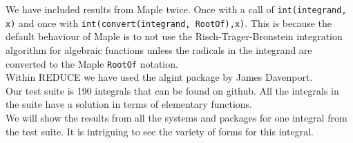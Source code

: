 \documentclass[12pt]{article}
\numberwithin{equation}{section}
\theoremstyle{definition}
\begin{document}
We have included results from Maple twice. Once with a call of \texttt{int(integrand, x)} 
and once with \texttt{int(convert(integrand, RootOf),x)}. This is because the default 
behaviour of Maple is to not use the Risch-Trager-Bronstein integration 
algorithm\cite{Trager1984}\cite{Bronstein1990} for algebraic functions unless the 
radicals in the integrand are converted to the Maple \texttt{RootOf} notation.\\

Within REDUCE we have used the algint package by James Davenport\cite{Davenport1979}. \\

Our test suite is 190 integrals that can be found on github\cite{test_suite_github}. 
All the integrals in the suite have a solution in terms of elementary functions. \\

We will show the results from all the systems and packages for one integral from the test 
suite. It is intriguing to see the variety of forms for this integral. \\
\end{document}
